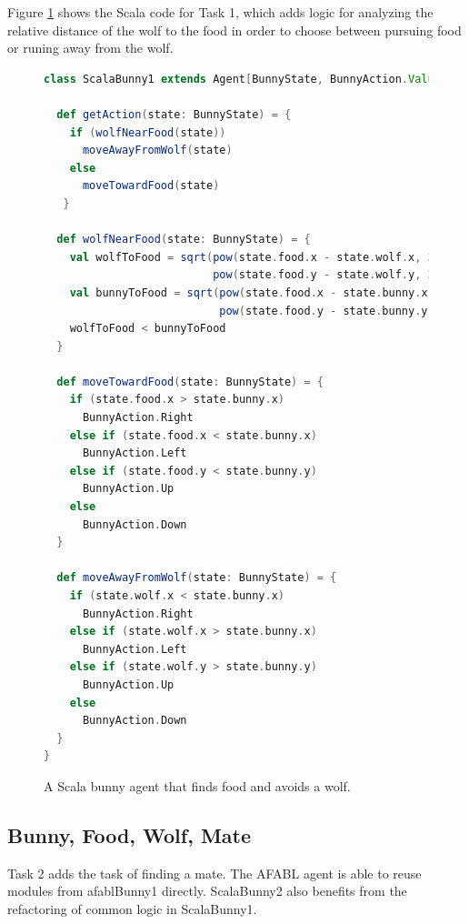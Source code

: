Figure  \ref{fig:scala1} shows the Scala code for Task 1, which adds logic for analyzing the relative distance of the wolf to the food in order to choose between pursuing food or runing away from the wolf.

\begin{figure}[h]
\begin{lstlisting}[language=Scala]
class ScalaBunny1 extends Agent[BunnyState, BunnyAction.Value] {

  def getAction(state: BunnyState) = {
    if (wolfNearFood(state))
      moveAwayFromWolf(state)
    else
      moveTowardFood(state)
   }

  def wolfNearFood(state: BunnyState) = {
    val wolfToFood = sqrt(pow(state.food.x - state.wolf.x, 2) +
                          pow(state.food.y - state.wolf.y, 2))
    val bunnyToFood = sqrt(pow(state.food.x - state.bunny.x, 2) +
                           pow(state.food.y - state.bunny.y, 2))
    wolfToFood < bunnyToFood
  }

  def moveTowardFood(state: BunnyState) = {
    if (state.food.x > state.bunny.x)
      BunnyAction.Right
    else if (state.food.x < state.bunny.x)
      BunnyAction.Left
    else if (state.food.y < state.bunny.y)
      BunnyAction.Up
    else
      BunnyAction.Down
  }

  def moveAwayFromWolf(state: BunnyState) = {
    if (state.wolf.x < state.bunny.x)
      BunnyAction.Right
    else if (state.wolf.x > state.bunny.x)
      BunnyAction.Left
    else if (state.wolf.y > state.bunny.y)
      BunnyAction.Up
    else
      BunnyAction.Down
  }
}
\end{lstlisting}
\caption{A Scala bunny agent that finds food and avoids a wolf.}
\label{fig:scala1}
\end{figure}

\subsection{Bunny, Food, Wolf, Mate}

Task 2 adds the task of finding a mate. The AFABL agent is able to reuse modules from afablBunny1 directly. ScalaBunny2 also benefits from the refactoring of common logic in ScalaBunny1.

